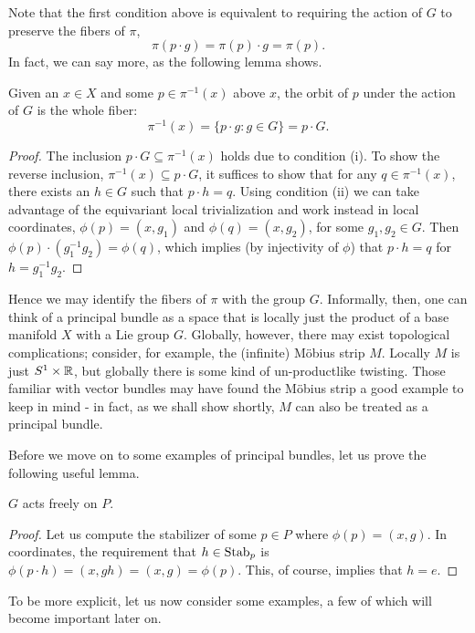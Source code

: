 Note that the first condition above is equivalent to requiring the action of $G$ to preserve the fibers of $\pi$,
\[\pi(p\cdot g)=\pi(p)\cdot g=\pi(p).\]
In fact, we can say more, as the following lemma shows.

\begin{lem}
    Given an $x\in X$ and some $p\in\pi^{-1}(x)$ above $x$, the orbit of $p$ under the action of $G$ is the whole fiber:
    \[\pi^{-1}(x)=\{p\cdot g: g\in G\}=p\cdot G.\]
\end{lem}
\begin{proof}
    The inclusion $p\cdot G\subseteq \pi^{-1}(x)$ holds due to condition (i). To show the reverse inclusion, $\pi^{-1}(x)\subseteq p\cdot G$, it suffices to show that for any $q\in\pi^{-1}(x)$, there exists an $h\in G$ such that $p\cdot h=q$. Using condition (ii) we can take advantage of the equivariant local trivialization and work instead in local coordinates, $\phi(p)=(x, g_1)$ and $\phi(q)=(x,g_2)$, for some $g_1,g_2\in G$. Then $\phi(p)\cdot (g_1^{-1}g_2)=\phi(q)$, which implies (by injectivity of $\phi$) that $p\cdot h=q$ for $h=g_1^{-1}g_2$.
\end{proof}

Hence we may identify the fibers of $\pi$ with the group $G$.
Informally, then, one can think of a principal bundle as a space that is locally just the product of a base manifold $X$ with a Lie group $G$.
Globally, however, there may exist topological complications; consider, for example, the (infinite) M\"obius strip $M$.
Locally $M$ is just $S^1\times \mathbb{R}$, but globally there is some kind of un-productlike twisting. Those familiar with vector bundles
may have found the M\"obius strip a good example to keep in mind - in fact, as we shall show shortly, $M$ can also be
treated as a principal bundle. 

Before we move on to some examples of principal bundles, let us prove the following useful lemma.

\begin{lem}
    $G$ acts freely on $P$.
\end{lem}
\begin{proof}
    Let us compute the stabilizer of some $p\in P$ where $\phi(p)=(x,g)$.
    In coordinates, the requirement that $h\in\operatorname{Stab}_p$ is
    $\phi(p\cdot h)=(x,gh)=(x,g)=\phi(p).$
    This, of course, implies that $h=e$.
\end{proof}

To be more explicit, let us now consider some examples, a few of which will become important later on.

